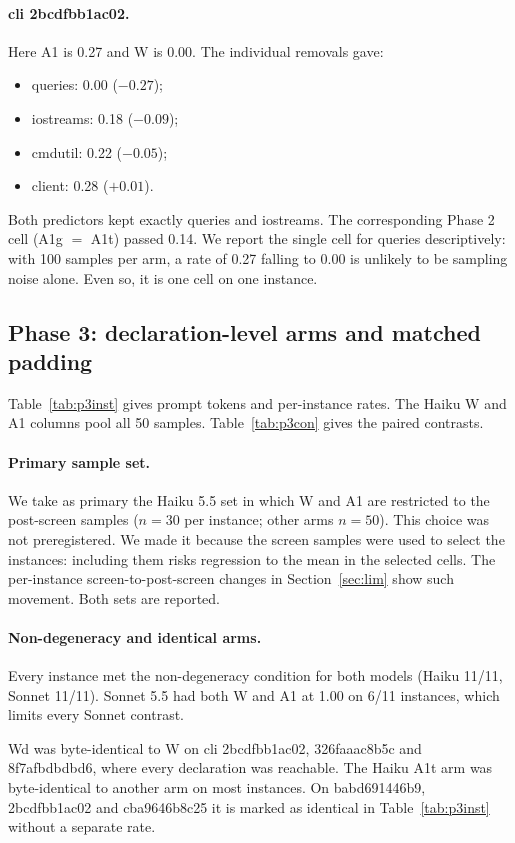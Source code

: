 \paragraph{cli 2bcdfbb1ac02.} Here A1 is 0.27 and W is 0.00. The individual removals gave:
\begin{itemize}
\item queries: 0.00 ($-0.27$);
\item iostreams: 0.18 ($-0.09$);
\item cmdutil: 0.22 ($-0.05$);
\item client: 0.28 ($+0.01$).
\end{itemize}
Both predictors kept exactly queries and iostreams. The corresponding Phase 2 cell (A1g $=$ A1t) passed 0.14. We report the single cell for queries descriptively: with 100 samples per arm, a rate of 0.27 falling to 0.00 is unlikely to be sampling noise alone. Even so, it is one cell on one instance.

\subsection{Phase 3: declaration-level arms and matched padding}

Table~\ref{tab:p3inst} gives prompt tokens and per-instance rates. The Haiku W and A1 columns pool all 50 samples. Table~\ref{tab:p3con} gives the paired contrasts.

\paragraph{Primary sample set.} We take as primary the Haiku 5.5 set in which W and A1 are restricted to the post-screen samples ($n=30$ per instance; other arms $n=50$). This choice was not preregistered. We made it because the screen samples were used to select the instances: including them risks regression to the mean in the selected cells. The per-instance screen-to-post-screen changes in Section~\ref{sec:lim} show such movement. Both sets are reported.

\paragraph{Non-degeneracy and identical arms.} Every instance met the non-degeneracy condition for both models (Haiku 11/11, Sonnet 11/11). Sonnet 5.5 had both W and A1 at 1.00 on 6/11 instances, which limits every Sonnet contrast.

Wd was byte-identical to W on cli 2bcdfbb1ac02, 326faaac8b5c and 8f7afbdbdbd6, where every declaration was reachable. The Haiku A1t arm was byte-identical to another arm on most instances. On babd691446b9, 2bcdfbb1ac02 and cba9646b8c25 it is marked as identical in Table~\ref{tab:p3inst} without a separate rate.

